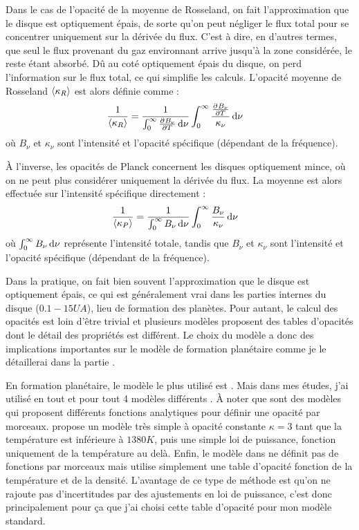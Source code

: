 Dans le cas de l'opacité de la moyenne de Rosseland, on fait l'approximation que le disque est optiquement épais, de sorte qu'on peut négliger le flux total pour se concentrer uniquement sur la dérivée du flux. C'est à dire, en d'autres termes, que seul le flux provenant du gaz environnant arrive jusqu'à la zone considérée, le reste étant absorbé. Dû au coté optiquement épais du disque, on perd l'information sur le flux total, ce qui simplifie les calculs. L'opacité moyenne de Rosseland $\left\langle \kappa_R\right\rangle$ est alors définie comme : 
\begin{align}
\inv{\moy{\kappa_R}} &= \inv{\int_0^\infty \pd{B_\nu}{T}\dif \nu} \int_0^\infty \frac{\pd{B_\nu}{T}}{\kappa_\nu}\dif \nu
\end{align}
où $B_\nu$ et $\kappa_\nu$ sont l'intensité et l'opacité spécifique (dépendant de la fréquence).

À l'inverse, les opacités de Planck concernent les disques optiquement mince, où on ne peut plus considérer uniquement la dérivée du flux. La moyenne est alors effectuée sur l'intensité spécifique directement : 
\begin{align}
\frac{1}{\left\langle \kappa_P\right\rangle} &= \frac{1}{\int_0^\infty B_\nu\operatorname{d \!} \nu} \int_0^\infty \frac{B_\nu}{\kappa_\nu}\operatorname{d \!} \nu
\end{align}
où $\int_0^\infty B_\nu\operatorname{d \!} \nu$ représente l'intensité totale, tandis que $B_\nu$ et $\kappa_\nu$ sont l'intensité et l'opacité spécifique (dépendant de la fréquence).

Dans la pratique, on fait bien souvent l'approximation que le disque est optiquement épais, ce qui est généralement vrai dans les parties internes du disque ($0.1-15\unit{UA}$), lieu de formation des planètes. Pour autant, le calcul des opacités est loin d'être trivial et plusieurs modèles proposent des tables d'opacités dont le détail des propriétés est différent. Le choix du modèle a donc des implications importantes sur le modèle de formation planétaire comme je le détaillerai dans la partie . 

En formation planétaire, le modèle le plus utilisé est \citep{bell1994FU}. Mais dans mes études, j'ai utilisé en tout et pour tout 4 modèles différents \citep{bell1994FU, zhu2009nonsteady, chambers2009analytic, hure2000transition}. À noter que \citep{bell1994FU, zhu2009nonsteady} sont des modèles qui proposent différents fonctions analytiques pour définir une opacité par morceaux. \citep{chambers2009analytic} propose un modèle très simple à opacité constante $\kappa=3$ tant que la température est inférieure à $1380\unit{K}$, puis une simple loi de puissance, fonction uniquement de la température au delà. Enfin, le modèle dans \citep{hure2000transition} ne définit pas de fonctions par morceaux mais utilise simplement une table d'opacité fonction de la température et de la densité. L'avantage de ce type de méthode est qu'on ne rajoute pas d'incertitudes par des ajustements en loi de puissance, c'est donc principalement pour ça que j'ai choisi cette table d'opacité pour mon modèle standard. 

